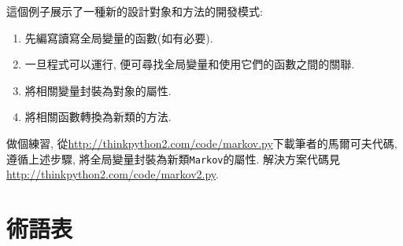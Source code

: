 \documentclass[10pt]{book}
\begin{document}
這個例子展示了一種新的設計對象和方法的開發模式:

\begin{enumerate}

\item 先編寫讀寫全局變量的函數(如有必要).

\item 一旦程式可以運行, 便可尋找全局變量和使用它們的函數之間的關聯.

\item 將相關變量封裝為對象的屬性.

\item 將相關函數轉換為新類的方法.

\end{enumerate}

做個練習, 從\url{http://thinkpython2.com/code/markov.py}下載筆者的馬爾可夫代碼, 
遵循上述步驟, 將全局變量封裝為新類{\tt Markov}的屬性. 
解決方案代碼見\url{http://thinkpython2.com/code/markov2.py}.



\section{術語表}
\end{document}
